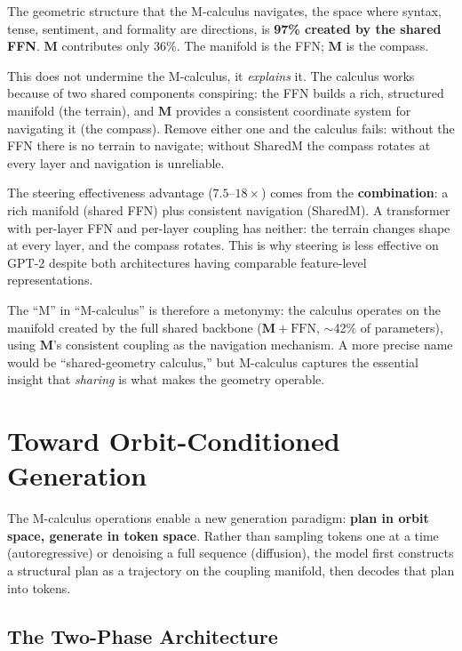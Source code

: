 \documentclass[11pt, a4paper]{article}
\newcommand{\M}{\mathbf{M}}
\theoremstyle{plain}
\theoremstyle{definition}
\theoremstyle{remark}
\begin{document}
The geometric structure that the M-calculus navigates, the space where syntax, tense, sentiment, and formality are directions, is \textbf{97\% created by the shared FFN}.
$\M$ contributes only 36\%.
The manifold is the FFN; $\M$ is the compass.

This does not undermine the M-calculus, it \emph{explains} it.
The calculus works because of two shared components conspiring:
the FFN builds a rich, structured manifold (the terrain), and $\M$ provides a consistent coordinate system for navigating it (the compass).
Remove either one and the calculus fails: without the FFN there is no terrain to navigate; without SharedM the compass rotates at every layer and navigation is unreliable.

The steering effectiveness advantage ($7.5$--$18\times$) comes from the \textbf{combination}: a rich manifold (shared FFN) plus consistent navigation (SharedM).
A transformer with per-layer FFN and per-layer coupling has neither: the terrain changes shape at every layer, and the compass rotates.
This is why steering is less effective on GPT-2 despite both architectures having comparable feature-level representations.

The ``M'' in ``M-calculus'' is therefore a metonymy: the calculus operates on the manifold created by the full shared backbone ($\M + \text{FFN}$, $\sim$42\% of parameters), using $\M$'s consistent coupling as the navigation mechanism.
A more precise name would be ``shared-geometry calculus,'' but M-calculus captures the essential insight that \emph{sharing} is what makes the geometry operable.

\section{Toward Orbit-Conditioned Generation}
\label{sec:generation}

The M-calculus operations enable a new generation paradigm: \textbf{plan in orbit space, generate in token space}.
Rather than sampling tokens one at a time (autoregressive) or denoising a full sequence (diffusion), the model first constructs a structural plan as a trajectory on the coupling manifold, then decodes that plan into tokens.

\subsection{The Two-Phase Architecture}
\end{document}
